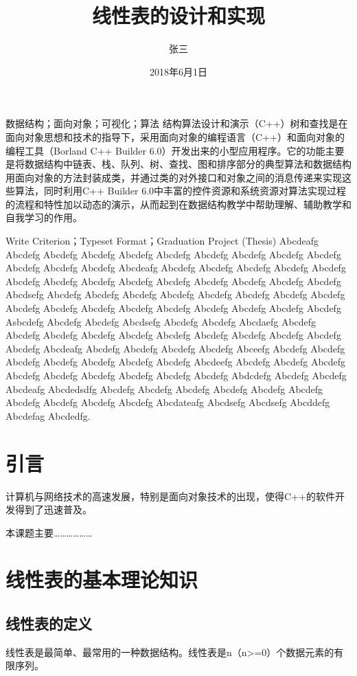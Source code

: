\documentclass[supercite]{upcthesis}
\title{线性表的设计和实现}
\author{张三}
\date{2018年6月1日}
\begin{document}
	\maketitle
	\begin{cnabstract}{数据结构；面向对象；可视化；算法}
		结构算法设计和演示（C++）树和查找是在面向对象思想和技术的指导下，采用面向对象的编程语言（C++）和面向对象的编程工具（Borland C++ Builder 6.0）开发出来的小型应用程序。它的功能主要是将数据结构中链表、栈、队列、树、查找、图和排序部分的典型算法和数据结构用面向对象的方法封装成类，并通过类的对外接口和对象之间的消息传递来实现这些算法，同时利用C++ Builder 6.0中丰富的控件资源和系统资源对算法实现过程的流程和特性加以动态的演示，从而起到在数据结构教学中帮助理解、辅助教学和自我学习的作用。
	\end{cnabstract}
    
	\begin{enabstract}{Write Criterion；Typeset Format；Graduation Project (Thesis)}
	Abcdeafg Abcdefg Abcdefg Abcdefg Abcdefg Abcdefg Abcdefg Abcdefg Abcdefg Abcdefg Abcdefg Abcdefg Abcdefg Abcdeafg Abcdefg Abcdefg Abcdefg Abcdefg Abcdefg Abcdefg Abcdefg Abcdefg Abcdefg Abcdefg Abcdefg Abcdefg Abcdefg Abcdefg Abcdsefg Abcdefg Abcdefg Abcdefg Abcdefg Abcdefg Abcdefg Abcdefg Abcdefg Abcdefg Abcdefg Abcdefg Abcdefg Abcdefg Abcdefg Abcdefg Abcdefg Abcdefg Asbcdefg Abcdefg Abcdefg Abcdsefg Abcdefg Abcdefg Abcdaefg Abcdefg Abcdefg Abcdefg Abcdefg Abcdefg Abcdefg Abcdefg Abcdefg Abcdefg Abcdefg Abcdefg Abcdeafg Abcdefg Abcdefg Abcdefg Abcdefg Abceefg Abcdefg Abcdefg Abcdefg Abcdefg Abcdefg Abcdefg Abcdefg Abcdeefg Abcdefg Abcdefg Abcdefg Abcdefg Abcdefg Abcdefg Abcdefg Abcdefg Abcdefg Abdcdefg Abcdefg Abcdefg Abcdeafg Abcdedsdfg Abcdefg Abcdefg Abcdefg Abcdefg Abcdefg Abcdefg Abcdefg Abcdefg Abcdefg Abcdefg Abcdateafg Abcdsefg Abcdsefg Abcddefg Abcdefag Abcdedfg.
	\end{enabstract}

\tableofcontents

\section{引言}
计算机与网络技术的高速发展，特别是面向对象技术的出现，使得C++的软件开发得到了迅速普及。

本课题主要………………
\section{线性表的基本理论知识}
\subsection{线性表的定义}
线性表是最简单、最常用\cite{Rouse1974Monitoring}的一种数据结构。线性表\cite{贾永红2010数字图像处理}是n（n>=0）个数据元素的有限序列。
\end{document}
